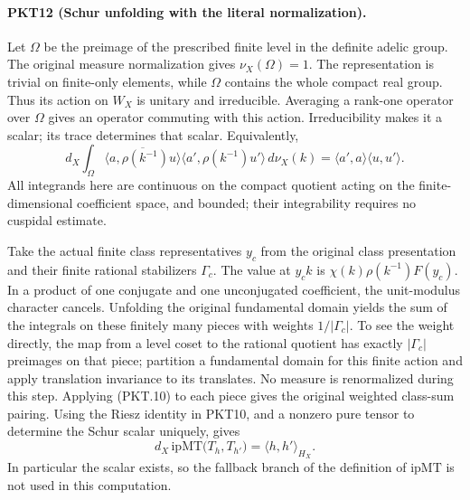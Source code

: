 \paragraph{PKT12 (Schur unfolding with the literal normalization).}\label{claim:PKT12}
Let $\Omega$ be the preimage of the prescribed finite level in the definite
adelic group.  The original measure normalization gives $\nu_X(\Omega)=1$.
The representation is trivial on finite-only elements, while $\Omega$
contains the whole compact real group.  Thus its action on $W_X$ is unitary
and irreducible.  Averaging a rank-one operator over $\Omega$ gives an
operator commuting with this action.  Irreducibility makes it a scalar;
its trace determines that scalar.  Equivalently,
\[
 d_X\!\int_\Omega
 \overline{\langle a,\rho(k^{-1})u\rangle}
 \langle a',\rho(k^{-1})u'\rangle\,d\nu_X(k)
 =\langle a',a\rangle\langle u,u'\rangle .
 \tag{PKT.10}
\]
All integrands here are continuous on the compact quotient acting on the
finite-dimensional coefficient space, and bounded; their integrability
requires no cuspidal estimate.

Take the actual finite class representatives $y_c$ from the original class
presentation and their finite rational stabilizers $\Gamma_c$.  The value
at $y_ck$ is $\chi(k)\rho(k^{-1})F(y_c)$.  In a product of one conjugate
and one unconjugated coefficient, the unit-modulus character cancels.
Unfolding the original fundamental domain yields the sum of the integrals
on these finitely many pieces with weights $1/|\Gamma_c|$.  To see the
weight directly, the map from a level coset to the rational quotient has
exactly $|\Gamma_c|$ preimages on that piece; partition a fundamental
domain for this finite action and apply translation invariance to its
translates.  No measure is renormalized during this step.  Applying
(PKT.10) to each piece gives the original weighted class-sum pairing.
Using the Riesz identity in PKT10, and a nonzero pure tensor to determine
the Schur scalar uniquely, gives
\[
 d_X\,\mathrm{ipMT}\bigl(T_h,T_{h'}\bigr)
       =\langle h,h'\rangle_{H_X}.
 \tag{PKT.11}
\]
In particular the scalar exists, so the fallback branch of the definition
of $\mathrm{ipMT}$ is not used in this computation.


